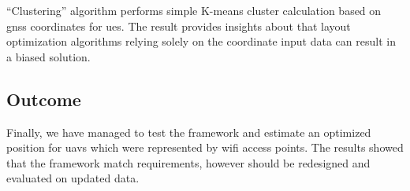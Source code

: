 ``Clustering'' algorithm performs simple K-means cluster calculation
based on \gls{gnss} coordinates for \glspl{ue}. The result provides insights about that layout optimization algorithms relying solely on the coordinate input data can result in a biased solution.

\subsection{Outcome}

Finally, we have managed to test the framework and estimate an optimized position for \glspl{uav} which were represented by \gls{wifi} access points. The results showed that the framework match requirements, however should be redesigned and evaluated on updated data.
